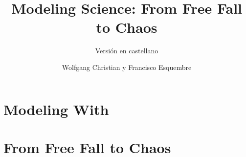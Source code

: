 \documentclass[10pt,final]{flwide10}
\begin{document}
  \frontmatter
  \title{Modeling Science: From Free Fall to Chaos}

    \subtitle{Versi\'{o}n en castellano}

  \author{Wolfgang Christian y \linebreak Francisco Esquembre}

    \maketitle

  \frontmatter

  \mainmatter
    \part{Modeling With \Ejs} %
    \part{From Free Fall to Chaos} %

    \appendix

  \backmatter
    
    

\end{document}
